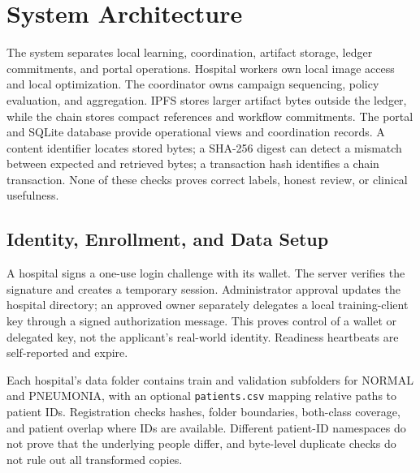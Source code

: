 \documentclass[12pt,a4paper]{report}
\begin{document}
\section{System Architecture}
The system separates local learning, coordination, artifact storage, ledger commitments, and portal operations. Hospital workers own local image access and local optimization. The coordinator owns campaign sequencing, policy evaluation, and aggregation. IPFS stores larger artifact bytes outside the ledger, while the chain stores compact references and workflow commitments. The portal and SQLite database provide operational views and coordination records. A content identifier locates stored bytes; a SHA-256 digest can detect a mismatch between expected and retrieved bytes; a transaction hash identifies a chain transaction. None of these checks proves correct labels, honest review, or clinical usefulness.

\subsection{Identity, Enrollment, and Data Setup}
A hospital signs a one-use login challenge with its wallet. The server verifies the signature and creates a temporary session. Administrator approval updates the hospital directory; an approved owner separately delegates a local training-client key through a signed authorization message. This proves control of a wallet or delegated key, not the applicant's real-world identity. Readiness heartbeats are self-reported and expire.

Each hospital's data folder contains train and validation subfolders for NORMAL and PNEUMONIA, with an optional \texttt{patients.csv} mapping relative paths to patient IDs. Registration checks hashes, folder boundaries, both-class coverage, and patient overlap where IDs are available. Different patient-ID namespaces do not prove that the underlying people differ, and byte-level duplicate checks do not rule out all transformed copies.
\end{document}
